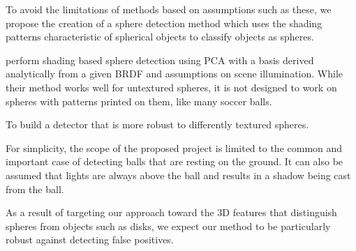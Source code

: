 \documentclass[11pt]{scrartcl}
\begin{document}
{        To avoid the limitations of methods based on assumptions such as
        these, we propose the creation of a sphere detection method which uses
        the shading patterns characteristic of spherical objects to classify
        objects as spheres.

        \citet{nillius2008shading} perform shading based sphere detection
        using PCA with a basis derived analytically from a given BRDF and assumptions
        on scene illumination. While their method works well for untextured spheres, it is
        not designed to work on spheres with patterns printed on them, like many
        soccer balls.

        To build a detector that is more robust to differently textured spheres.



		For simplicity, the scope of the proposed project is limited
        to the common and important case of detecting balls that are resting
        on the ground. It can also be assumed that lights are always above the ball
        and results in a shadow being cast from the ball.



        As a result of targeting our approach toward the 3D features that
        distinguish spheres from objects such as disks, we expect our method
        to be particularly robust against detecting false positives.
	}
\end{document}
